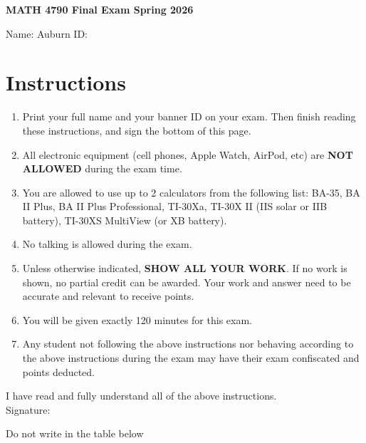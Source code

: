 \documentclass[12pt]{article}
\begin{document}
\begin{center}
    \Large \textbf{MATH 4790 Final Exam Spring 2026} \\[1em]
\end{center}

\vspace{.25cm}

\noindent Name: \underline{\hspace{8cm}} \hspace{.25cm} Auburn ID: \underline{\hspace{4cm}}



\section*{Instructions}
\begin{enumerate}[label=\arabic*.]
\item Print your full name and your banner ID on your exam. Then finish reading these instructions, and sign the bottom of this page.
\item All electronic equipment (cell phones, Apple Watch, AirPod, etc) are \textbf{NOT ALLOWED} during the exam time.
\item You are allowed to use up to 2 calculators from the following list: BA-35, BA II Plus, BA II Plus Professional, TI-30Xa, TI-30X II (IIS solar or IIB battery), TI-30XS MultiView (or XB battery).
\item No talking is allowed during the exam.
\item Unless otherwise indicated, \textbf{SHOW ALL YOUR WORK}. If no work is shown, no partial credit can be awarded. Your work and answer need to be accurate and relevant to receive points.
\item You will be given exactly 120 minutes for this exam.
\item Any student not following the above instructions nor behaving according to the above instructions during the exam may have their exam confiscated and points deducted.
\end{enumerate}

I have read and fully understand all of the above instructions. \\[2em]
Signature: \hrulefill


\vspace{.5cm}
Do not write in the table below
\end{document}
